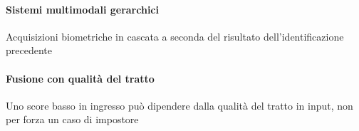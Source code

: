 \paragraph{Sistemi multimodali gerarchici}
Acquisizioni biometriche in cascata a seconda del risultato dell'identificazione precedente

\paragraph{Fusione con qualità del tratto}
Uno score basso in ingresso può dipendere dalla qualità del tratto in input, non per forza un caso di impostore

\newpage